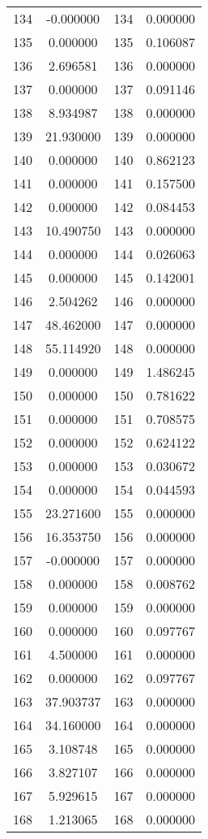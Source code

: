 \documentclass[12pt]{article}
\begin{document}
\begin{longtable}{@{}cccc@{}}
134 & -0.000000 & 134 & 0.000000 \\
135 & 0.000000 & 135 & 0.106087 \\
136 & 2.696581 & 136 & 0.000000 \\
137 & 0.000000 & 137 & 0.091146 \\
138 & 8.934987 & 138 & 0.000000 \\
139 & 21.930000 & 139 & 0.000000 \\
140 & 0.000000 & 140 & 0.862123 \\
141 & 0.000000 & 141 & 0.157500 \\
142 & 0.000000 & 142 & 0.084453 \\
143 & 10.490750 & 143 & 0.000000 \\
144 & 0.000000 & 144 & 0.026063 \\
145 & 0.000000 & 145 & 0.142001 \\
146 & 2.504262 & 146 & 0.000000 \\
147 & 48.462000 & 147 & 0.000000 \\
148 & 55.114920 & 148 & 0.000000 \\
149 & 0.000000 & 149 & 1.486245 \\
150 & 0.000000 & 150 & 0.781622 \\
151 & 0.000000 & 151 & 0.708575 \\
152 & 0.000000 & 152 & 0.624122 \\
153 & 0.000000 & 153 & 0.030672 \\
154 & 0.000000 & 154 & 0.044593 \\
155 & 23.271600 & 155 & 0.000000 \\
156 & 16.353750 & 156 & 0.000000 \\
157 & -0.000000 & 157 & 0.000000 \\
158 & 0.000000 & 158 & 0.008762 \\
159 & 0.000000 & 159 & 0.000000 \\
160 & 0.000000 & 160 & 0.097767 \\
161 & 4.500000 & 161 & 0.000000 \\
162 & 0.000000 & 162 & 0.097767 \\
163 & 37.903737 & 163 & 0.000000 \\
164 & 34.160000 & 164 & 0.000000 \\
165 & 3.108748 & 165 & 0.000000 \\
166 & 3.827107 & 166 & 0.000000 \\
167 & 5.929615 & 167 & 0.000000 \\
168 & 1.213065 & 168 & 0.000000 \\

\end{longtable}
\end{document}
